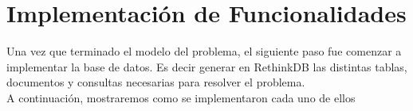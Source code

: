 \section{Implementación  de Funcionalidades}

Una vez que terminado el modelo del problema, el siguiente paso fue comenzar a implementar la base de datos. Es decir generar en RethinkDB las distintas tablas, documentos y consultas necesarias para resolver el problema.\\

A continuación, mostraremos como se implementaron cada uno de ellos